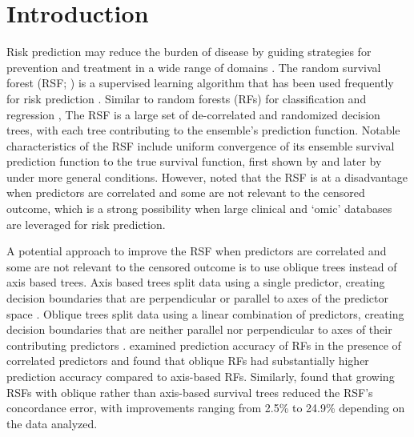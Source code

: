 \documentclass{article}\usepackage[]{graphicx}\usepackage[]{xcolor}
\begin{document}
\section{Introduction}

Risk prediction may reduce the burden of disease by guiding strategies for prevention and treatment in a wide range of domains \citep{moons2012riskII, moons2012riskI}. The random survival forest (RSF; \citet{ishwaran2008random, hothorn2006unbiased}) is a supervised learning algorithm that has been used frequently for risk prediction \citep{wang2017selective}. Similar to random forests (RFs) for classification and regression \citep{breiman2001random}, The RSF is a large set of de-correlated and randomized decision trees, with each tree contributing to the ensemble's prediction function. Notable characteristics of the RSF include uniform convergence of its ensemble survival prediction function to the true survival function, first shown by \citet{ishwaran2010consistency} and later by \citet{cui2017consistency} under more general conditions. However, \citet{cui2017consistency} noted that the RSF is at a disadvantage when predictors are correlated and some are not relevant to the censored outcome, which is a strong possibility when large clinical and `omic' databases are leveraged for risk prediction.

A potential approach to improve the RSF when predictors are correlated and some are not relevant to the censored outcome is to use oblique trees instead of axis based trees. Axis based trees split data using a single predictor, creating decision boundaries that are perpendicular or parallel to axes of the predictor space \citep[see][Chapter~2]{breiman2017classification}. Oblique trees split data using a linear combination of predictors, creating decision boundaries that are neither parallel nor perpendicular to axes of their contributing predictors \citep[see][Chapter~5]{breiman2017classification}. \citet{menze2011oblique} examined prediction accuracy of RFs in the presence of correlated predictors and found that oblique RFs had substantially higher prediction accuracy compared to axis-based RFs. Similarly, \citet{jaeger2019oblique} found that growing RSFs with oblique rather than axis-based survival trees reduced the RSF's concordance error, with improvements ranging from 2.5\% to 24.9\% depending on the data analyzed.
\end{document}
